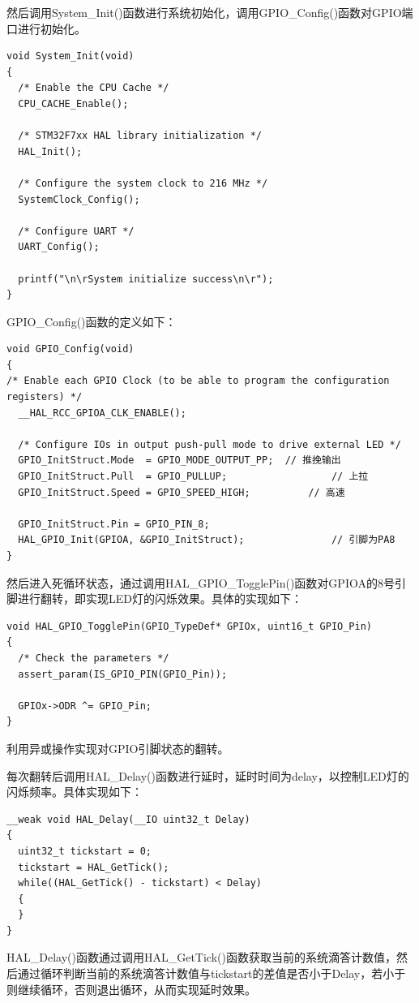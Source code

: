 ﻿\documentclass[UTF8,12pt]{article}
\begin{document}
然后调用System\_Init()函数进行系统初始化，调用GPIO\_Config()函数对GPIO端口进行初始化。

\begin{lstlisting}[frame=shadowbox]
void System_Init(void)
{
  /* Enable the CPU Cache */
  CPU_CACHE_Enable();

  /* STM32F7xx HAL library initialization */
  HAL_Init();

  /* Configure the system clock to 216 MHz */
  SystemClock_Config();
  
  /* Configure UART */
  UART_Config();
  
  printf("\n\rSystem initialize success\n\r");
}
\end{lstlisting}
GPIO\_Config()函数的定义如下：

\begin{lstlisting}[frame=shadowbox]
void GPIO_Config(void)
{
/* Enable each GPIO Clock (to be able to program the configuration registers) */
  __HAL_RCC_GPIOA_CLK_ENABLE();
  
  /* Configure IOs in output push-pull mode to drive external LED */
  GPIO_InitStruct.Mode  = GPIO_MODE_OUTPUT_PP;	// 推挽输出
  GPIO_InitStruct.Pull  = GPIO_PULLUP;					// 上拉
  GPIO_InitStruct.Speed = GPIO_SPEED_HIGH;			// 高速

  GPIO_InitStruct.Pin = GPIO_PIN_8;
  HAL_GPIO_Init(GPIOA, &GPIO_InitStruct);				// 引脚为PA8
}

\end{lstlisting}
然后进入死循环状态，通过调用HAL\_GPIO\_TogglePin()函数对GPIOA的8号引脚进行翻转，即实现LED灯的闪烁效果。具体的实现如下：

\begin{lstlisting}[frame=shadowbox]
void HAL_GPIO_TogglePin(GPIO_TypeDef* GPIOx, uint16_t GPIO_Pin)
{
  /* Check the parameters */
  assert_param(IS_GPIO_PIN(GPIO_Pin));

  GPIOx->ODR ^= GPIO_Pin;
}
\end{lstlisting}
利用异或操作实现对GPIO引脚状态的翻转。

每次翻转后调用HAL\_Delay()函数进行延时，延时时间为delay，以控制LED灯的闪烁频率。具体实现如下：

\begin{lstlisting}[frame=shadowbox]
__weak void HAL_Delay(__IO uint32_t Delay)
{
  uint32_t tickstart = 0;
  tickstart = HAL_GetTick();
  while((HAL_GetTick() - tickstart) < Delay)
  {
  }
}
\end{lstlisting}
HAL\_Delay()函数通过调用HAL\_GetTick()函数获取当前的系统滴答计数值，然后通过循环判断当前的系统滴答计数值与tickstart的差值是否小于Delay，若小于则继续循环，否则退出循环，从而实现延时效果。
\end{document}
